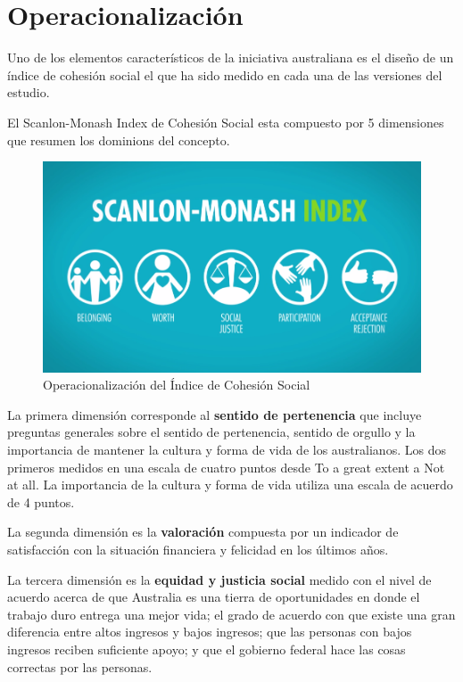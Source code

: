 \documentclass[
  12pt,
]{book}
\begin{document}
\hypertarget{operacionalizaciuxf3n-1}{%
\section{Operacionalización}\label{operacionalizaciuxf3n-1}}

Uno de los elementos característicos de la iniciativa australiana es el
diseño de un índice de cohesión social el que ha sido medido en cada una
de las versiones del estudio.

El Scanlon-Monash Index de Cohesión Social esta compuesto por 5
dimensiones que resumen los dominions del concepto.

\begin{figure}
\centering
\includegraphics{inputs/images/scalon.png}
\caption{Operacionalización del Índice de Cohesión
Social}
\end{figure}

La primera dimensión corresponde al \textbf{sentido de pertenencia} que
incluye preguntas generales sobre el sentido de pertenencia, sentido de
orgullo y la importancia de mantener la cultura y forma de vida de los
australianos. Los dos primeros medidos en una escala de cuatro puntos
desde To a great extent a Not at all. La importancia de la cultura y
forma de vida utiliza una escala de acuerdo de 4 puntos.

La segunda dimensión es la \textbf{valoración} compuesta por un indicador de
satisfacción con la situación financiera y felicidad en los últimos
años.

La tercera dimensión es la \textbf{equidad y justicia social} medido con el
nivel de acuerdo acerca de que Australia es una tierra de oportunidades
en donde el trabajo duro entrega una mejor vida; el grado de acuerdo con
que existe una gran diferencia entre altos ingresos y bajos ingresos;
que las personas con bajos ingresos reciben suficiente apoyo; y que el
gobierno federal hace las cosas correctas por las personas.
\end{document}
